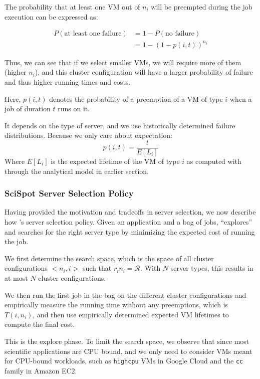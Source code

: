 The probability that at least one VM out of $n_i$ will be preempted during the job execution can be expressed as:

\begin{align}
  \label{eq:pfail1}
  P(\text{at least one failure}) &= 1-P(\text{no failure}) \\
                                 &= 1-(1-p(i, t))^{n_i} 
\end{align}

Thus, we can see that if we select smaller VMs, we will require more of them (higher $n_i$), and this cluster configuration will have a larger probability of failure and thus higher running times and costs. 

Here, $p(i, t)$ denotes the probability of a preemption of a VM of type $i$ when a job of duration $t$ runs on it. 

It depends on the type of server, and we use historically determined failure distributions.
Because we only care about expectation: 
\begin{equation}
  \label{eq:pi}
  p(i, t) = \dfrac{t}{E[L_i]}
\end{equation}
Where $E[L_i]$ is the expected lifetime of the VM of type $i$ as computed with through the analytical model in earlier section. 


\subsubsection{SciSpot Server Selection Policy}

Having provided the motivation and tradeoffs in server selection, we now describe how \sysname's server selection policy. 
Given an application and a bag of jobs, \sysname ``explores'' and searches for the right server type by minimizing the expected cost of running the job.

We first determine the search space, which is the space of all cluster configurations $<n_i,i>$ such that $r_i n_i = \mathcal{R}$. With $N$ server types, this results in at most $N$ cluster configurations.

We then run the first job in the bag on the different cluster configurations and empirically measure the running time without any preemptions, which is $T(i, n_i)$, and then use empirically determined expected VM lifetimes to compute the final cost.

This is the explore phase.
To limit the search space, we observe that since most scientific applications are CPU bound, and we only need to consider VMs meant for CPU-bound workloads, such as \texttt{highcpu} VMs in Google Cloud and the \texttt{cc} family in Amazon EC2.

